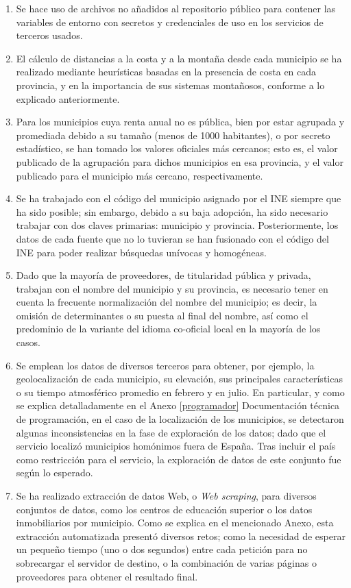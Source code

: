 \begin{enumerate}
    \item Se hace uso de archivos no añadidos al repositorio público para contener las variables de entorno con secretos y credenciales de uso en los servicios de terceros usados.
    \item El cálculo de distancias a la costa y a la montaña desde cada municipio se ha realizado mediante heurísticas basadas en la presencia de costa en cada provincia, y en la importancia de sus sistemas montañosos, conforme a lo explicado anteriormente.
    \item Para los municipios cuya renta anual no es pública, bien por estar agrupada y promediada debido a su tamaño (menos de 1000 habitantes), o por secreto estadístico, se han tomado los valores oficiales más cercanos; esto es, el valor publicado de la agrupación para dichos municipios en esa provincia, y el valor publicado para el municipio más cercano, respectivamente.
    \item Se ha trabajado con el código del municipio asignado por el INE siempre que ha sido posible; sin embargo, debido a su baja adopción, ha sido necesario trabajar con dos claves primarias: municipio y provincia. Posteriormente, los datos de cada fuente que no lo tuvieran se han fusionado con el código del INE para poder realizar búsquedas unívocas y homogéneas.
    \item Dado que la mayoría de proveedores, de titularidad pública y privada, trabajan con el nombre del municipio y su provincia, es necesario tener en cuenta la frecuente normalización del nombre del municipio; es decir, la omisión de determinantes o su puesta al final del nombre, así como el predominio de la variante del idioma co-oficial local en la mayoría de los casos.
    \item Se emplean los datos de diversos terceros para obtener, por ejemplo, la geolocalización de cada municipio, su elevación, sus principales características o su tiempo atmosférico promedio en febrero y en julio. En particular, y como se explica detalladamente en el Anexo \ref{programador} \guillemotleft Documentación técnica de programación\guillemotright, en el caso de la localización de los municipios, se detectaron algunas inconsistencias en la fase de exploración de los datos; dado que el servicio localizó municipios homónimos fuera de España. Tras incluir el país como restricción para el servicio, la exploración de datos de este conjunto fue según lo esperado.
    \item Se ha realizado extracción de datos Web, o \textit{Web scraping}, para diversos conjuntos de datos, como los centros de educación superior o los datos inmobiliarios por municipio. Como se explica en el mencionado Anexo, esta extracción automatizada presentó diversos retos; como la necesidad de esperar un pequeño tiempo (uno o dos segundos) entre cada petición para no sobrecargar el servidor de destino, o la combinación de varias páginas o proveedores para obtener el resultado final.

\end{enumerate}
